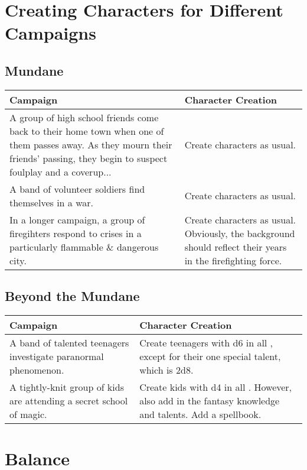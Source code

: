 \section{Creating Characters for Different Campaigns}
\subsection{Mundane}
\begin{center}
	\begin{xltabular}{\textwidth}{XX}
		Campaign & Character Creation \\
		\hline
		A group of high school friends come back to their home town when one of them passes away. As they mourn their friends' passing, they begin to suspect foulplay and a coverup... & Create characters as usual. \\
		A band of volunteer soldiers find themselves in a war. & Create characters as usual. \\
		In a longer campaign, a group of firegihters respond to crises in a particularly flammable \& dangerous city. & Create characters as usual. Obviously, the background should reflect their years in the firefighting force. \\
	\end{xltabular}
\end{center}


\subsection{Beyond the Mundane}
\begin{center}
	\begin{xltabular}{\textwidth}{XX}
		Campaign & Character Creation \\
		\hline
		A band of talented teenagers investigate paranormal phenomenon. & Create teenagers with d6 in all , except for their one special talent, which is 2d8.\\
   		A tightly-knit group of kids are attending a secret school of magic. & Create kids with d4 in all . However, also add in the fantasy knowledge and talents. Add a spellbook. \\
	\end{xltabular}
\end{center}

\section*{Balance}

